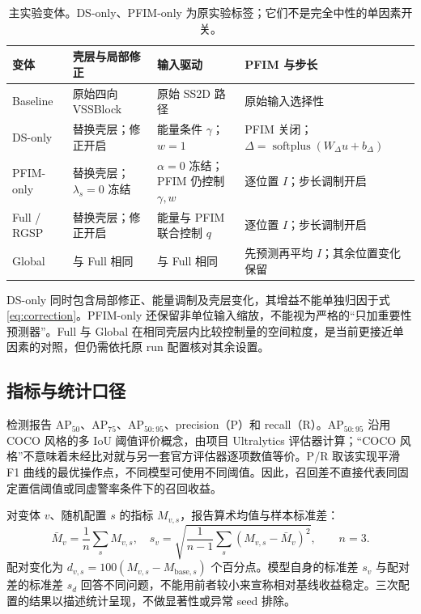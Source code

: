 \documentclass[UTF8,11pt,a4paper,fontset=fandol]{ctexart}
\newcommand{\ap}{\mathrm{AP}}
\newcommand{\softplus}{\operatorname{softplus}}
\begin{document}
\begin{table}[!htbp]\centering\small
\caption{主实验变体。DS-only、PFIM-only 为原实验标签；它们不是完全中性的单因素开关。}
\label{tab:variants}
\begin{tabularx}{\linewidth}{P{2.1cm}P{2.8cm}YY}
\toprule
变体 & 壳层与局部修正 & 输入驱动 & PFIM 与步长\\
\midrule
Baseline & 原始四向 VSSBlock & 原始 SS2D 路径 & 原始输入选择性\\
DS-only & 替换壳层；修正开启 & 能量条件 $\gamma$；$w=1$ & PFIM 关闭；$\Delta=\softplus(W_\Delta u+b_\Delta)$\\
PFIM-only & 替换壳层；$\lambda_s=0$ 冻结 & $\alpha=0$ 冻结；PFIM 仍控制 $\gamma,w$ & 逐位置 $I$；步长调制开启\\
Full / RGSP & 替换壳层；修正开启 & 能量与 PFIM 联合控制 $q$ & 逐位置 $I$；步长调制开启\\
Global & 与 Full 相同 & 与 Full 相同 & 先预测再平均 $I$；其余位置变化保留\\
\bottomrule
\end{tabularx}
\end{table}

DS-only 同时包含局部修正、能量调制及壳层变化，其增益不能单独归因于式\eqref{eq:correction}。PFIM-only 还保留非单位输入缩放，不能视为严格的“只加重要性预测器”。Full 与 Global 在相同壳层内比较控制量的空间粒度，是当前更接近单因素的对照，但仍需依托原 run 配置核对其余设置。

\subsection{指标与统计口径}
检测报告 $\ap_{50}$、$\ap_{75}$、$\ap_{50:95}$、precision（P）和 recall（R）。$\ap_{50:95}$ 沿用 COCO 风格的多 IoU 阈值评价概念\cite{coco2014}，由项目 Ultralytics 评估器计算；“COCO 风格”不意味着未经比对就与另一套官方评估器逐项数值等价。P/R 取该实现平滑 F1 曲线的最优操作点，不同模型可使用不同阈值。因此，召回差不直接代表同固定置信阈值或同虚警率条件下的召回收益。

对变体 $v$、随机配置 $s$ 的指标 $M_{v,s}$，报告算术均值与样本标准差：
\begin{equation}
\bar M_v=\frac{1}{n}\sum_sM_{v,s},\quad
s_v=\sqrt{\frac{1}{n-1}\sum_s(M_{v,s}-\bar M_v)^2},\qquad n=3.
\end{equation}
配对变化为 $d_{v,s}=100(M_{v,s}-M_{\mathrm{base},s})$ 个百分点。模型自身的标准差 $s_v$ 与配对差的标准差 $s_d$ 回答不同问题，不能用前者较小来宣称相对基线收益稳定。三次配置的结果以描述统计呈现，不做显著性或异常 seed 排除。
\end{document}
